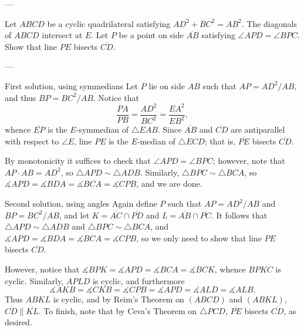
---

Let $ABCD$ be a cyclic quadrilateral satisfying $AD^2+BC^2=AB^2$. The diagonals of $ABCD$ intersect at $E$. Let $P$ be a point on side $\overline{AB}$ satisfying $\angle APD=\angle BPC$. Show that line $PE$ bisects $\overline{CD}$.

---

\begin{customenv}{First solution, using symmedians}
    Let $P$ lie on side $AB$ such that $AP=AD^2/AB$, and thus $BP=BC^2/AB$. Notice that \[\frac{PA}{PB}=\frac{AD^2}{BC^2}=\frac{EA^2}{EB^2},\]
    whence $\overline{EP}$ is the $E$-symmedian of $\triangle EAB$. Since $\overline{AB}$ and $\overline{CD}$ are antiparallel with respect to $\angle E$, line $PE$ is the $E$-median of $\triangle ECD$; that is, $\overline{PE}$ bisects $\overline{CD}$.

    By monotonicity it suffices to check that $\angle APD=\angle BPC$; however, note that $AP\cdot AB=AD^2$, so $\triangle APD\sim\triangle ADB$. Similarly, $\triangle BPC\sim\triangle BCA$, so $\measuredangle APD=\measuredangle BDA=\measuredangle BCA=\measuredangle CPB$, and we are done. 
\end{customenv}
\begin{customenv}{Second solution, using angles}
    Again define $P$ such that $AP=AD^2/AB$ and $BP=BC^2/AB$, and let $K=\overline{AC}\cap\overline{PD}$ and $L=\overline{AB}\cap\overline{PC}$. It follows that $\triangle APD\sim\triangle ADB$ and $\triangle BPC\sim\triangle BCA$, and $\measuredangle APD=\measuredangle BDA=\measuredangle BCA=\measuredangle CPB$, so we only need to show that line $PE$ bisects $\overline{CD}$.

    However, notice that $\measuredangle BPK=\measuredangle APD=\measuredangle BCA=\measuredangle BCK$, whence $BPKC$ is cyclic. Similarly, $APLD$ is cyclic, and furthermore \[\measuredangle AKB=\measuredangle CKB=\measuredangle CPB=\measuredangle APD=\measuredangle ALD=\measuredangle ALB.\]
    Thus $ABKL$ is cyclic, and by Reim's Theorem on $(ABCD)$ and $(ABKL)$, $\overline{CD}\parallel\overline{KL}$. To finish, note that by Ceva's Theorem on $\triangle PCD$, $\overline{PE}$ bisects $\overline{CD}$, as desired. 
\end{customenv}
